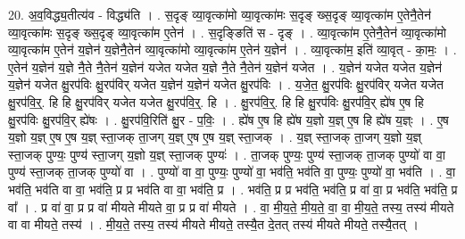 \documentclass[17pt]{extarticle}
\begin{document}
20. अ॒व॒विद्ध्य॒तीत्य॑व - विद्ध्य॑ति । . स॒दृङ् व्या॒वृत्का॑मो व्या॒वृत्का॑मः स॒दृङ् ख्स॒दृङ् व्या॒वृत्का॑म ए॒तेनै॒तेन॑ व्या॒वृत्का॑मः स॒दृङ् ख्स॒दृङ् व्या॒वृत्का॑म ए॒तेन॑ । . स॒दृङ्ङिति॑ स - दृङ् । . व्या॒वृत्का॑म ए॒तेनै॒तेन॑ व्या॒वृत्का॑मो व्या॒वृत्का॑म ए॒तेन॑ य॒ज्ञेन॑ य॒ज्ञेनै॒तेन॑ व्या॒वृत्का॑मो व्या॒वृत्का॑म ए॒तेन॑ य॒ज्ञेन॑ । . व्या॒वृत्का॑म॒ इति॑ व्या॒वृत् - का॒मः॒ । . ए॒तेन॑ य॒ज्ञेन॑ य॒ज्ञे नै॒ते नै॒तेन॑ य॒ज्ञेन॑ यजेत यजेत य॒ज्ञे नै॒ते नै॒तेन॑ य॒ज्ञेन॑ यजेत । . य॒ज्ञेन॑ यजेत यजेत य॒ज्ञेन॑ य॒ज्ञेन॑ यजेत क्षु॒रप॑विः क्षु॒रप॑विर् यजेत य॒ज्ञेन॑ य॒ज्ञेन॑ यजेत क्षु॒रप॑विः । . य॒जे॒त॒ क्षु॒रप॑विः क्षु॒रप॑विर् यजेत यजेत क्षु॒रप॑वि॒र्॒. हि हि क्षु॒रप॑विर् यजेत यजेत क्षु॒रप॑वि॒र्॒. हि । . क्षु॒रप॑वि॒र्॒. हि हि क्षु॒रप॑विः क्षु॒रप॑वि॒र् ह्ये॑ष ए॒ष हि क्षु॒रप॑विः क्षु॒रप॑वि॒र् ह्ये॑षः । . क्षु॒रप॑वि॒रिति॑ क्षु॒र - प॒विः॒ । . ह्ये॑ष ए॒ष हि ह्ये॑ष य॒ज्ञो य॒ज्ञ् ए॒ष हि ह्ये॑ष य॒ज्ञ्ः । . ए॒ष य॒ज्ञो य॒ज्ञ् ए॒ष ए॒ष य॒ज्ञ् स्ता॒जक् ता॒जग् य॒ज्ञ् ए॒ष ए॒ष य॒ज्ञ् स्ता॒जक् । . य॒ज्ञ् स्ता॒जक् ता॒जग् य॒ज्ञो य॒ज्ञ् स्ता॒जक् पुण्यः॒ पुण्य॑ स्ता॒जग् य॒ज्ञो य॒ज्ञ् स्ता॒जक् पुण्यः॑ । . ता॒जक् पुण्यः॒ पुण्य॑ स्ता॒जक् ता॒जक् पुण्यो॑ वा वा॒ पुण्य॑ स्ता॒जक् ता॒जक् पुण्यो॑ वा । . पुण्यो॑ वा वा॒ पुण्यः॒ पुण्यो॑ वा॒ भव॑ति॒ भव॑ति वा॒ पुण्यः॒ पुण्यो॑ वा॒ भव॑ति । . वा॒ भव॑ति॒ भव॑ति वा वा॒ भव॑ति॒ प्र प्र भव॑ति वा वा॒ भव॑ति॒ प्र । . भव॑ति॒ प्र प्र भव॑ति॒ भव॑ति॒ प्र वा॑ वा॒ प्र भव॑ति॒ भव॑ति॒ प्र वा᳚ । . प्र वा॑ वा॒ प्र प्र वा॑ मीयते मीयते वा॒ प्र प्र वा॑ मीयते । . वा॒ मी॒य॒ते॒ मी॒य॒ते॒ वा॒ वा॒ मी॒य॒ते॒ तस्य॒ तस्य॑ मीयते वा वा मीयते॒ तस्य॑ । . मी॒य॒ते॒ तस्य॒ तस्य॑ मीयते मीयते॒ तस्यै॒त दे॒तत् तस्य॑ मीयते मीयते॒ तस्यै॒तत् । \newline
\end{document}
